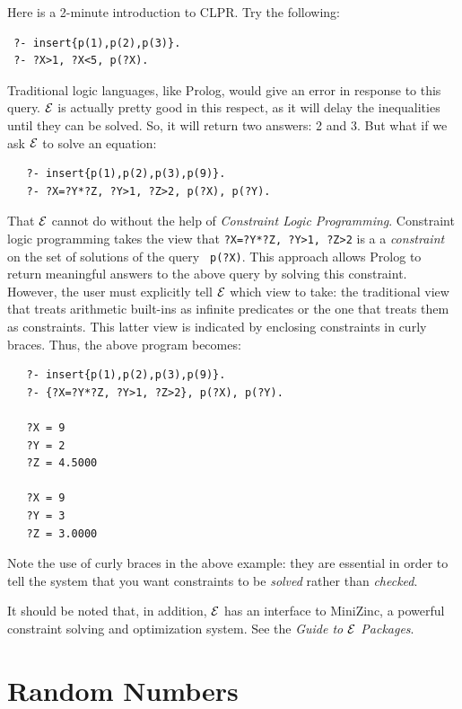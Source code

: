\documentclass[11pt]{article}
\newcommand{\ERGO}{\mbox{\ensuremath{\cal{E}}\smaller{{\sc{RGO}}}}\xspace}
\newcommand{\FLSYSTEM}{\ERGO}
\begin{document}
Here is a 2-minute introduction to CLPR. Try the following:
\begin{verbatim}
 ?- insert{p(1),p(2),p(3)}.
 ?- ?X>1, ?X<5, p(?X).
\end{verbatim}
Traditional logic languages, like Prolog, would give an error
in response to this query. \FLSYSTEM is actually pretty good in this respect,
as it will delay the inequalities until they can be solved. So, it will
return two answers: 2 and 3. But what if we ask \FLSYSTEM to solve an equation:
\begin{verbatim}
   ?- insert{p(1),p(2),p(3),p(9)}.
   ?- ?X=?Y*?Z, ?Y>1, ?Z>2, p(?X), p(?Y).
\end{verbatim}
That \FLSYSTEM cannot do without the help of 
\emph{Constraint Logic Programming}.
Constraint logic programming takes the view that
\texttt{?X=?Y*?Z, ?Y>1, ?Z>2} is a  
a \emph{constraint} on the set of solutions of the query {\tt
  p(?X)}. This approach allows Prolog to return meaningful answers to the
above query by solving this constraint.
However, the user must explicitly tell \FLSYSTEM which view
  to take: the traditional view that treats arithmetic built-ins as
  infinite predicates or the one that treats them as constraints.
  This latter view is indicated by enclosing constraints in curly
  braces. Thus, the above program becomes:
\begin{verbatim}
   ?- insert{p(1),p(2),p(3),p(9)}.
   ?- {?X=?Y*?Z, ?Y>1, ?Z>2}, p(?X), p(?Y).
  
   ?X = 9
   ?Y = 2
   ?Z = 4.5000

   ?X = 9
   ?Y = 3
   ?Z = 3.0000
\end{verbatim}
  Note the use of curly braces in the above example: they are essential in
  order to tell the system that you want constraints to be \emph{solved}
  rather than \emph{checked}.  

  It should be noted that, in addition,
  \ERGO has an interface to MiniZinc, a powerful
  constraint solving and optimization system.
  See 
the \emph{Guide to \FLSYSTEM Packages}.

\section{Random Numbers} \label{sec-random-num}
\end{document}
